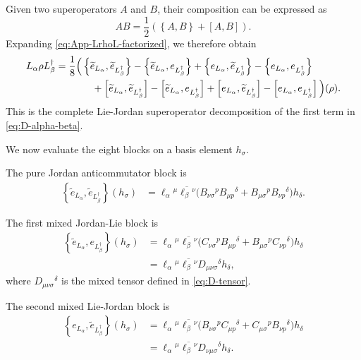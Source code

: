 \documentclass[notitlepage,aip,reprint,onecolumn]{revtex4-1}
\theoremstyle{definition}
\renewcommand{\comm}[2]{\left[#1,#2\right]}
\newcommand{\acom}[2]{\left\{#1,#2\right\}}
\begin{document}
Given two superoperators \(A\) and \(B\), their composition can be expressed as
\[
AB
=
\frac12
\left(
\acom{A}{B}
+
\comm{A}{B}
\right).
\]
Expanding \eqref{eq:App-LrhoL-factorized}, we therefore obtain
\begin{align}
L_\alpha\rho L_\beta^\dagger
&=
\frac18
\Big(
\acom{\widetilde e_{L_\alpha}}
      {\widetilde e_{L_\beta^\dagger}}
-
\acom{\widetilde e_{L_\alpha}}
      {e_{L_\beta^\dagger}}
+
\acom{e_{L_\alpha}}
      {\widetilde e_{L_\beta^\dagger}}
-
\acom{e_{L_\alpha}}
      {e_{L_\beta^\dagger}}
\notag\\
&\hspace{1.3cm}
+
\comm{\widetilde e_{L_\alpha}}
      {\widetilde e_{L_\beta^\dagger}}
-
\comm{\widetilde e_{L_\alpha}}
      {e_{L_\beta^\dagger}}
+
\comm{e_{L_\alpha}}
      {\widetilde e_{L_\beta^\dagger}}
-
\comm{e_{L_\alpha}}
      {e_{L_\beta^\dagger}}
\Big)(\rho).
\label{eq:LrhoL-super-expanded}
\end{align}
This is the complete Lie-Jordan superoperator decomposition of the first term in \eqref{eq:D-alpha-beta}.

We now evaluate the eight blocks on a basis element \(h_\sigma\).

The pure Jordan anticommutator block is
\[
\begin{aligned}
\acom{\widetilde e_{L_\alpha}}
      {\widetilde e_{L_\beta^\dagger}}(h_\sigma)
&=
\ell_\alpha{}^\mu
\overline{\ell_\beta{}^\nu}
\Big(
B_{\nu\sigma}{}^pB_{\mu p}{}^\delta
+
B_{\mu\sigma}{}^pB_{\nu p}{}^\delta
\Big)h_\delta.
\end{aligned}
\]

The first mixed Jordan-Lie block is
\[
\begin{aligned}
\acom{\widetilde e_{L_\alpha}}
      {e_{L_\beta^\dagger}}(h_\sigma)
&=
\ell_\alpha{}^\mu
\overline{\ell_\beta{}^\nu}
\Big(
C_{\nu\sigma}{}^pB_{\mu p}{}^\delta
+
B_{\mu\sigma}{}^pC_{\nu p}{}^\delta
\Big)h_\delta
\\
&=
\ell_\alpha{}^\mu
\overline{\ell_\beta{}^\nu}
D_{\mu\nu\sigma}{}^\delta h_\delta,
\end{aligned}
\]
where \(D_{\mu\nu\sigma}{}^\delta\) is the mixed tensor defined in \eqref{eq:D-tensor}.

The second mixed Lie-Jordan block is
\[
\begin{aligned}
\acom{e_{L_\alpha}}
      {\widetilde e_{L_\beta^\dagger}}(h_\sigma)
&=
\ell_\alpha{}^\mu
\overline{\ell_\beta{}^\nu}
\Big(
B_{\nu\sigma}{}^pC_{\mu p}{}^\delta
+
C_{\mu\sigma}{}^pB_{\nu p}{}^\delta
\Big)h_\delta
\\
&=
\ell_\alpha{}^\mu
\overline{\ell_\beta{}^\nu}
D_{\nu\mu\sigma}{}^\delta h_\delta.
\end{aligned}
\]
\end{document}
